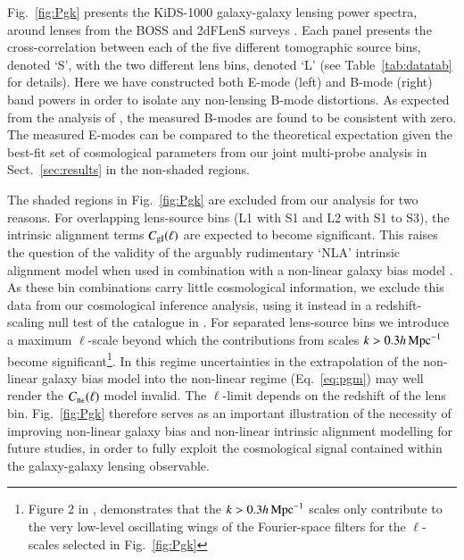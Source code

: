 Fig.~\ref{fig:Pgk} presents the KiDS-1000 galaxy-galaxy lensing power spectra, around lenses from the BOSS and 2dFLenS surveys \citep[see][for the real-space KiDS-1000 galaxy-galaxy lensing measurements for BOSS and 2dFLenS separately]{blake/etal:2020}.   Each panel presents the cross-correlation between each of the five different tomographic source bins, denoted `S', with the two different lens bins, denoted `L' (see Table~\ref{tab:datatab} for details).  Here we have constructed both E-mode (left) and B-mode (right) band powers in order to isolate any non-lensing B-mode distortions.     As expected from the analysis of \citet{giblin/etal:inprep}, the measured B-modes are found to be consistent with zero.   The measured E-modes can be compared to the theoretical expectation given the best-fit set of cosmological parameters from our joint multi-probe analysis in Sect.~\ref{sec:results} in the non-shaded regions.    

The shaded regions in Fig.~\ref{fig:Pgk} are excluded from our analysis for two reasons.   For overlapping lens-source bins (L1 with S1 and L2 with S1 to S3), the intrinsic alignment terms $C_{\rm gI}(\ell)$ are expected to become significant.   This raises the question of the validity of the arguably rudimentary `NLA' intrinsic alignment model when used in combination with a non-linear galaxy bias model \citep[see][for a self-consistent pertubative approach to both intrinsic alignment and galaxy bias modelling]{blazek/etal:2019}.   As these bin combinations carry little cosmological information, we exclude this data from our cosmological inference analysis, using it instead in a redshift-scaling null test of the catalogue in \citet{giblin/etal:inprep}.   For separated lens-source bins we introduce a maximum $\ell$-scale beyond which the contributions from scales $k > 0.3 h \,{\rm Mpc}^{-1}$ become significant\footnote{Figure 2 in \citet{joachimi/etal:inprep}, demonstrates that the $k > 0.3 h \,{\rm Mpc}^{-1}$ scales only contribute to the very low-level oscillating wings of the Fourier-space filters for the $\ell$-scales selected in Fig.~\ref{fig:Pgk}}.  In this regime uncertainties in the extrapolation of the \citet{sanchez/etal:2017} non-linear galaxy bias model into the non-linear regime (Eq.~\ref{eq:pgm}) may well render the $C_{\rm n \epsilon}(\ell)$ model invalid.   The $\ell$-limit depends on the redshift of the lens bin.    Fig.~\ref{fig:Pgk} therefore serves as an important illustration of the necessity of improving non-linear galaxy bias and non-linear intrinsic alignment modelling for future studies, in order to fully exploit the cosmological signal contained within the galaxy-galaxy lensing observable.


